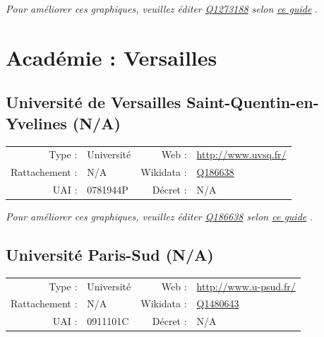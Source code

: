 \documentclass[12pt,french,landscape]{article}
\begin{document}
\textit{\scriptsize Pour améliorer ces graphiques, veuillez éditer \href{https://www.wikidata.org/entity/Q1273188}{Q1273188}  selon \href{https://github.com/cpesr/wikidataESR/blob/master/Rmd/wikidataESR.md}{ce guide}}
.


\newpage

\hypertarget{acaduxe9mie-versailles}{%
\section{Académie : Versailles}\label{acaduxe9mie-versailles}}

\hypertarget{universituxe9-de-versailles-saint-quentin-en-yvelines-na}{%
\subsection{Université de Versailles Saint-Quentin-en-Yvelines
(N/A)}\label{universituxe9-de-versailles-saint-quentin-en-yvelines-na}}

\begin{tabular*}{0.45\textwidth}{rp{2cm}rl}  
\hline  
Type : & Université & Web : &\href{http://www.uvsq.fr/}{http://www.uvsq.fr/} \\  
Rattachement : & N/A & Wikidata : & \href{https://www.wikidata.org/entity/Q186638}{Q186638} \\  
UAI : & 0781944P & Décret : & N/A \\  
\hline  
\end{tabular*}

\textit{\scriptsize Pour améliorer ces graphiques, veuillez éditer \href{https://www.wikidata.org/entity/Q186638}{Q186638}  selon \href{https://github.com/cpesr/wikidataESR/blob/master/Rmd/wikidataESR.md}{ce guide}}
.


\newpage

\hypertarget{universituxe9-paris-sud-na}{%
\subsection{Université Paris-Sud
(N/A)}\label{universituxe9-paris-sud-na}}

\begin{tabular*}{0.45\textwidth}{rp{2cm}rl}  
\hline  
Type : & Université & Web : &\href{http://www.u-psud.fr/}{http://www.u-psud.fr/} \\  
Rattachement : & N/A & Wikidata : & \href{https://www.wikidata.org/entity/Q1480643}{Q1480643} \\  
UAI : & 0911101C & Décret : & N/A \\  
\hline  
\end{tabular*}
\end{document}
